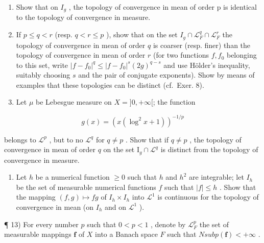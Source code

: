 \begin{enumerate}
\def\labelenumi{\alph{enumi})}
\item
  Show that on \(I_{g}\) , the topology of convergence in mean of order p is identical to the topology of convergence in measure.
\item
  If \(p \leqslant q < r\) (resp. \(q < r \leqslant p\) ), show that on the set \(I_g \cap \mathcal{L}_F^q \cap \mathcal{L}_F^r\) the topology of convergence in mean of order \(q\) is coarser (resp. finer) than the topology of convergence in mean of order \(r\) (for two functions \(f, f_0\) belonging to this set, write \(|f - f_0|^q \leqslant |f - f_0|^s(2g)^{q-s}\) and use Hölder's inequality, suitably choosing \(s\) and the pair of conjugate exponents). Show by means of examples that these topologies can be distinct (cf.~Exer. 8).
\item
  Let \(\mu\) be Lebesgue measure on \(X = ]0, +\infty[\); the function
\end{enumerate}

\[
g (x) = \left(x (\log^ {2} x + 1)\right) ^ {- 1 / p}
\]

belongs to \(\mathcal{L}^p\) , but to no \(\mathcal{L}^q\) for \(q \neq p\) . Show that if \(q \neq p\) , the topology of convergence in mean of order \(q\) on the set \(\mathrm{I}_g \cap \mathcal{L}^q\) is distinct from the topology of convergence in measure.

\begin{enumerate}
\def\labelenumi{\arabic{enumi})}
\setcounter{enumi}{11}
\tightlist
\item
  Let \(h\) be a numerical function \(\geqslant 0\) such that \(h\) and \(h^2\) are integrable; let \(I_h\) be the set of measurable numerical functions \(f\) such that \(|f| \leqslant h\) . Show that the mapping \((f, g) \mapsto fg\) of \(I_h \times I_h\) into \(\mathcal{L}^1\) is continuous for the topology of convergence in mean (on \(I_h\) and on \(\mathcal{L}^1\) ).
\end{enumerate}

¶ 13) For every number \(p\) such that \(0 < p < 1\) , denote by \(\mathcal{L}_F^p\) the set of measurable mappings \(\mathbf{f}\) of \(X\) into a Banach space \(F\) such that \(N sub p(\mathbf{f}) < +\infty\) .

